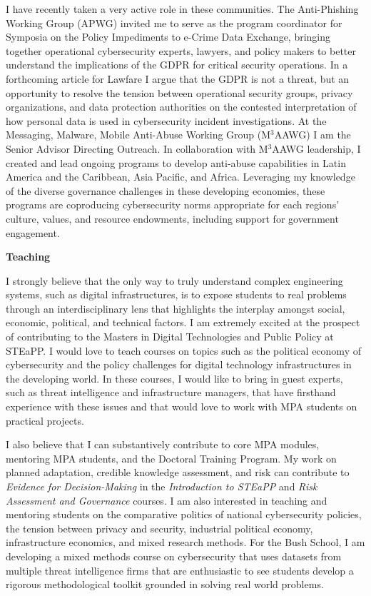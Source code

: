 \documentclass[11pt]{letter}
\begin{document}
\begin{letter}
I have recently taken a very active role in these communities. The
Anti-Phishing Working Group (APWG) invited me to serve as the program
coordinator for Symposia on the Policy Impediments to e-Crime Data
Exchange, bringing together operational cybersecurity experts,
lawyers, and policy makers to better understand the implications of
the GDPR for critical security operations. 
%
In a forthcoming article for Lawfare I argue that the 
GDPR is not a threat, but an opportunity to resolve the tension
between operational security groups, privacy organizations, and data
protection authorities on the contested interpretation of how personal
data is used in cybersecurity incident investigations. 
%
At the Messaging, Malware, Mobile Anti-Abuse Working Group (M$^3$AAWG)
I am the Senior Advisor Directing Outreach.
%
In collaboration with M$^3$AAWG leadership, I created and lead ongoing
programs to 
develop anti-abuse capabilities in Latin America and the Caribbean, Asia Pacific, and Africa. 
%
Leveraging my knowledge of the diverse governance challenges in these
developing economies, these programs are coproducing cybersecurity
norms appropriate for each regions' culture, values, and resource
endowments, including support for government engagement.


\textbf{Teaching} 
\vspace{0.2 \baselineskip} 
\newline 

I strongly believe that the only way to truly understand complex
engineering systems, such as digital infrastructures, is to expose
students to real problems through an interdisciplinary lens that
highlights the interplay amongst social, economic, political, and
technical factors. 
%
I am extremely excited at the prospect of contributing to the Masters
in Digital Technologies and Public Policy at STEaPP. 
%
I would love to teach courses on topics such as the political economy
of cybersecurity and the policy challenges for digital technology
infrastructures in the developing world. 
%
In these courses, I would like to bring in guest experts, such as threat intelligence and infrastructure managers, that have firsthand experience with these issues and that would love to work with MPA students on practical projects. 


I also believe that I can substantively contribute to core MPA modules,
mentoring MPA students, and the Doctoral Training Program. 
%
My work on planned adaptation, credible knowledge
assessment, and risk can contribute to \emph{Evidence for
  Decision-Making} in
the \emph{Introduction to STEaPP} and \emph{Risk Assessment and Governance}
courses. 
%
I am also interested in teaching and mentoring students on the
comparative politics of national cybersecurity policies, the tension
between privacy and security, industrial political economy,
infrastructure economics, and mixed research methods. 
%
For the Bush School, I am developing a mixed methods course on cybersecurity that uses datasets from multiple threat intelligence firms that are enthusiastic to see students develop a rigorous methodological toolkit grounded in solving real world problems. 


\end{letter}
\end{document}
